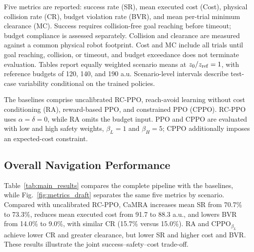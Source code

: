 \documentclass[conference]{IEEEtran}
\begin{document}
Five metrics are reported: success rate (SR), mean executed cost (Cost), physical
collision rate (CR), budget violation rate (BVR), and mean per-trial minimum
clearance (MC). Success requires collision-free goal reaching before timeout;
budget compliance is assessed separately. Collision and clearance are measured
against a common physical robot footprint. Cost and MC include all trials until
goal reaching, collision, or timeout, and budget exceedance does not terminate
evaluation. Tables report equally weighted scenario means at $z_0/z_{\rm ref}=1$,
with reference budgets of 120, 140, and 190 a.u. Scenario-level intervals describe
test-case variability conditional on the trained policies.

The baselines comprise uncalibrated RC-PPO, reach-avoid learning without cost
conditioning (RA), reward-based PPO, and constrained PPO (CPPO). RC-PPO uses
$\alpha=\delta=0$, while RA omits the budget input. PPO and CPPO are evaluated
with low and high safety weights, $\beta_L=1$ and $\beta_H=5$; CPPO additionally
imposes an expected-cost constraint.

\subsection{Overall Navigation Performance}
\label{sec:overall_performance}
Table~\ref{tab:main_results} compares the complete pipeline with the baselines,
while Fig.~\ref{fig:metrics_draft} separates the same five metrics by scenario.
Compared with uncalibrated RC-PPO, CaMRA increases mean SR from 70.7\% to
73.3\%, reduces mean executed cost from 91.7 to 88.3 a.u., and lowers BVR from
14.0\% to 9.0\%, with similar CR (15.7\% versus 15.0\%). RA and
CPPO$_{\beta_L}$ achieve lower CR and greater clearance, but lower SR and higher
cost and BVR. These results illustrate the joint success--safety--cost trade-off.
\end{document}
